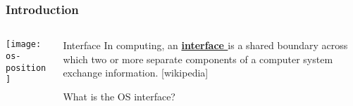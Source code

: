 %
%
\begin{frame}[plain]
	\frametitle{Introduction}
	
	
	
	\begin{columns}
		
		\begin{column}{.4\textwidth}
			
			\texttt{[image: os-position]}
			
		\end{column}
		
		\begin{column}{.6\textwidth}
			
	\begin{block}{Interface}
	In computing, an \textbf{\underline{interface }}is a shared boundary across which two or more separate components of a computer system exchange information. [wikipedia]
    \end{block} 
	\LARGE
	What is the OS interface?

		\end{column}
		
		
	\end{columns}
	
	
\end{frame}



